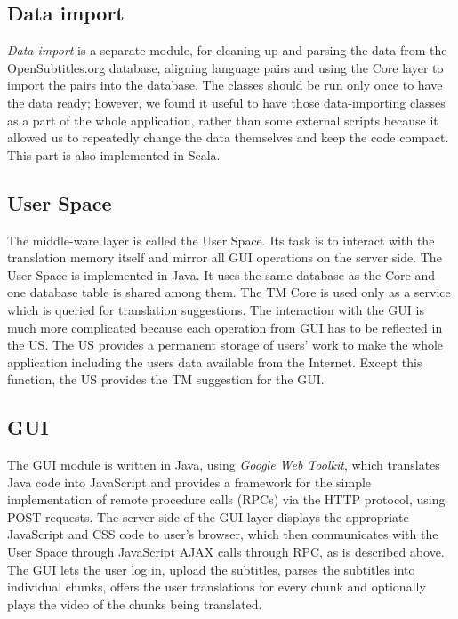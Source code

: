 \subsection*{Data import}

\emph{Data import} is a separate module, for cleaning up and parsing the data from the OpenSubtitles.org database, aligning language pairs and using the Core layer to import the pairs into the database. The classes should be run only once to have the data ready; however, we found it useful to have those data-importing classes as a part of the whole application, rather than some external scripts because it allowed us to repeatedly change the data themselves and keep the code compact. This part is also implemented in Scala.

\subsection*{User Space}

The middle-ware layer is called the User Space. Its task is to interact with the translation memory itself and mirror all GUI operations on the server side. The User Space is implemented in Java. It uses the same database as the Core and one database table is shared among them. The TM Core is used only as a service which is queried for translation suggestions. The interaction with the GUI is much more complicated because each operation from GUI has to be reflected in the US. The US provides a permanent storage of users' work to make the whole application including the users data available from the Internet. Except this function, the US provides the TM suggestion for the GUI.

\subsection*{GUI}

The GUI module is written in Java, using \emph{Google Web Toolkit}, which translates Java code into JavaScript and provides a framework for the simple implementation of remote procedure calls (RPCs) via the HTTP protocol, using POST requests. The server side of the GUI layer displays the appropriate JavaScript and CSS code to user's browser, which then communicates with the User Space through JavaScript AJAX calls through RPC, as is described above. The GUI lets the user log in, upload the subtitles, parses the subtitles into individual chunks, offers the user translations for every chunk and optionally plays the video of the chunks being translated.

